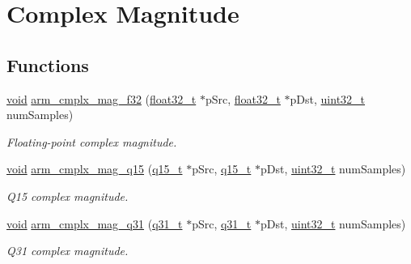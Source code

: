 \hypertarget{group__cmplx__mag}{\section{Complex Magnitude}
\label{group__cmplx__mag}
}
\subsection*{Functions}
\begin{DoxyCompactItemize}
\item 
\hyperlink{group___n_a_m_e_ga18028b8badbf1ea7e704ccac3c488e82}{void} \hyperlink{group__cmplx__mag_gae45024c497392cde2ae358a76d435213}{arm\-\_\-cmplx\-\_\-mag\-\_\-f32} (\hyperlink{arm__math_8h_a4611b605e45ab401f02cab15c5e38715}{float32\-\_\-t} $\ast$p\-Src, \hyperlink{arm__math_8h_a4611b605e45ab401f02cab15c5e38715}{float32\-\_\-t} $\ast$p\-Dst, \hyperlink{stdint_8h_a435d1572bf3f880d55459d9805097f62}{uint32\-\_\-t} num\-Samples)
\begin{DoxyCompactList}\small\item\em Floating-\/point complex magnitude. \end{DoxyCompactList}\item 
\hyperlink{group___n_a_m_e_ga18028b8badbf1ea7e704ccac3c488e82}{void} \hyperlink{group__cmplx__mag_ga0a4a8f77a6a51d9b3f3b9d729f85b7a4}{arm\-\_\-cmplx\-\_\-mag\-\_\-q15} (\hyperlink{arm__math_8h_ab5a8fb21a5b3b983d5f54f31614052ea}{q15\-\_\-t} $\ast$p\-Src, \hyperlink{arm__math_8h_ab5a8fb21a5b3b983d5f54f31614052ea}{q15\-\_\-t} $\ast$p\-Dst, \hyperlink{stdint_8h_a435d1572bf3f880d55459d9805097f62}{uint32\-\_\-t} num\-Samples)
\begin{DoxyCompactList}\small\item\em Q15 complex magnitude. \end{DoxyCompactList}\item 
\hyperlink{group___n_a_m_e_ga18028b8badbf1ea7e704ccac3c488e82}{void} \hyperlink{group__cmplx__mag_ga14f82f9230e9d96d5b9774e2fefcb7be}{arm\-\_\-cmplx\-\_\-mag\-\_\-q31} (\hyperlink{arm__math_8h_adc89a3547f5324b7b3b95adec3806bc0}{q31\-\_\-t} $\ast$p\-Src, \hyperlink{arm__math_8h_adc89a3547f5324b7b3b95adec3806bc0}{q31\-\_\-t} $\ast$p\-Dst, \hyperlink{stdint_8h_a435d1572bf3f880d55459d9805097f62}{uint32\-\_\-t} num\-Samples)
\begin{DoxyCompactList}\small\item\em Q31 complex magnitude. \end{DoxyCompactList}\end{DoxyCompactItemize}


